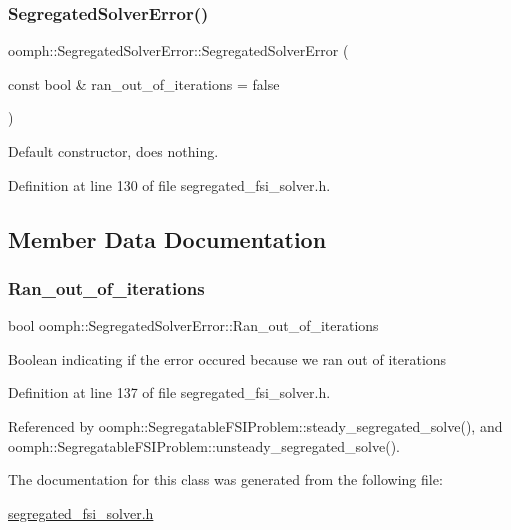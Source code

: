\subsubsection{\texorpdfstring{Segregated\+Solver\+Error()}{SegregatedSolverError()}}
{\footnotesize\ttfamily oomph\+::\+Segregated\+Solver\+Error\+::\+Segregated\+Solver\+Error (\begin{DoxyParamCaption}\item[{const bool \&}]{ran\+\_\+out\+\_\+of\+\_\+iterations = {\ttfamily false} }\end{DoxyParamCaption})\hspace{0.3cm}{\ttfamily [inline]}}



Default constructor, does nothing. 



Definition at line 130 of file segregated\+\_\+fsi\+\_\+solver.\+h.



\subsection{Member Data Documentation}
\mbox{\label{classoomph_1_1SegregatedSolverError_ad3aa39f2cc87179429a16373f197f600}} 
\subsubsection{\texorpdfstring{Ran\+\_\+out\+\_\+of\+\_\+iterations}{Ran\_out\_of\_iterations}}
{\footnotesize\ttfamily bool oomph\+::\+Segregated\+Solver\+Error\+::\+Ran\+\_\+out\+\_\+of\+\_\+iterations}

Boolean indicating if the error occured because we ran out of iterations 

Definition at line 137 of file segregated\+\_\+fsi\+\_\+solver.\+h.



Referenced by oomph\+::\+Segregatable\+F\+S\+I\+Problem\+::steady\+\_\+segregated\+\_\+solve(), and oomph\+::\+Segregatable\+F\+S\+I\+Problem\+::unsteady\+\_\+segregated\+\_\+solve().



The documentation for this class was generated from the following file\+:\begin{DoxyCompactItemize}
\item 
\hyperlink{segregated__fsi__solver_8h}{segregated\+\_\+fsi\+\_\+solver.\+h}\end{DoxyCompactItemize}
